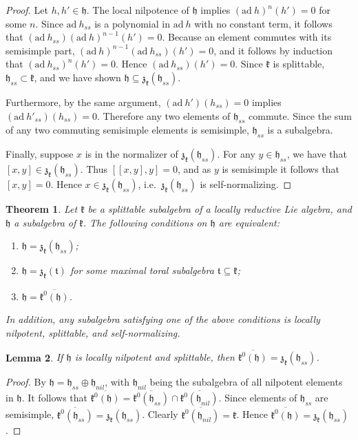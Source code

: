 \documentclass{article}
\def\h{\mathfrak {h}}
\def\t{\mathfrak{t}}
\def\z{\mathfrak {z}}
\def\k{\mathfrak{k}}
\newcommand {\ad}{\mathrm{ad \:}}
\newtheorem{thm}{Theorem}[section]
\newtheorem{lemma}[thm]{Lemma}
\begin{document}
\begin{proof}
Let $h, h' \in \h$.  The local nilpotence of $\h$ implies $(\ad
h)^n(h') = 0$ for some $n$.  Since $\ad h_{ss}$ is a polynomial in $\ad h$ with no constant term, it follows that $(\ad h_{ss})(\ad h)^{n-1}(h') = 0$.  Because an element commutes with its semisimple part, $(\ad h)^{n-1}(\ad h_{ss})(h') = 0$, and it follows by induction that $(\ad h_{ss})^n(h') = 0$.  Hence $(\ad h_{ss})(h') = 0$.  Since $\k$ is splittable, $\h_{ss} \subset \k$, and we have shown $\h \subseteq \z_\k(\h_{ss})$.

Furthermore, by the same argument, $(\ad h')(h_{ss}) = 0$ implies $(\ad h'_{ss})(h_{ss}) = 0$.  Therefore any two elements of $\h_{ss}$ commute.  Since the sum of any two commuting semisimple elements is semisimple, $\h_{ss}$ is a subalgebra.

Finally, suppose $x$ is in the normalizer of $ \z_\k(\h_{ss})$.  For any $y \in \h_{ss}$, we have that $[x,y] \in \z_\k(\h_{ss})$.  Thus $[[x,y],y]=0$, and as $y$ is semisimple it follows that $[x,y]=0$. Hence $x \in \z_\k(\h_{ss})$, i.e.\ $\z_\k(\h_{ss})$ is self-normalizing.
\end{proof}


\begin{thm} \label{main}
Let $\k$ be a splittable subalgebra of a locally reductive Lie algebra, and $\h$ a subalgebra of $\k$.  The following conditions on $\h$ are equivalent:
\begin{enumerate}
\item \label{D} $\h = \z_\k(\h_{ss})$;
\item  \label{E} $\h = \z_\k(\t)$ for some maximal toral subalgebra $\t \subseteq \k$;
\item \label{F} $\h = \overline{\k^0(\h)}$.
\end{enumerate}
In addition, any subalgebra satisfying one of the above conditions is locally nilpotent, splittable, and self-normalizing.
\end{thm}

\begin{lemma}\label{lemma1}
If $\h$ is locally nilpotent and splittable, then $\overline{\k^0(\h)} = \z_\k(\h_{ss})$.
\end{lemma}
\begin{proof}
By \cite[Ch. VII, \S 5, Prop. 5]{Bourbaki} $\h = \h_{ss} \oplus \h_{nil}$, with $\h_{nil}$ being the subalgebra of all nilpotent elements in $\h$.  It follows that  $\overline{\k^0(\h)} = \overline{\k^0(\h_{ss})} \cap \overline{\k^0(\h_{nil})}$.  Since elements of $\h_{ss}$ are semisimple, $\overline{\k^0(\h_{ss})} = \z_\k(\h_{ss})$.  Clearly $\overline{\k^0(\h_{nil})} = \k$. Hence $\overline{\k^0(\h)} = \z_\k(\h_{ss})$.
\end{proof}
\end{document}
